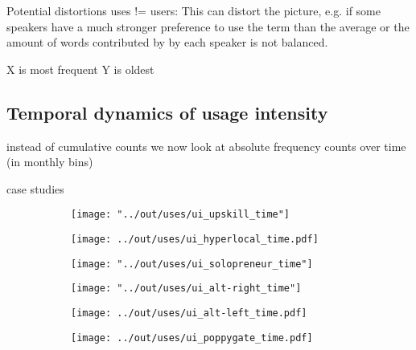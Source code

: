 \documentclass[draft, a4paper, abstract=on]{scrartcl}
\begin{document}
Potential distortions
uses != users: This can distort the picture, e.g. if some speakers have a much stronger preference to use the term than the average or the amount of words contributed by by each speaker is not balanced.


X is most frequent
Y is oldest

  \subsection{Temporal dynamics of usage intensity}

instead of cumulative counts we now look at absolute frequency counts over time (in monthly bins)

case studies

\begin{figure}
\caption{Temporal dynamics in usage frequency for case studies.}
\centering
\begin{subfigure}{.3\linewidth}
\caption{}
\texttt{[image: "../out/uses/ui\_upskill\_time"]}
\end{subfigure}
\begin{subfigure}{.3\linewidth}
\caption{}
\texttt{[image: ../out/uses/ui\_hyperlocal\_time.pdf]}
\end{subfigure}
\begin{subfigure}{.3\linewidth}
\caption{}
\texttt{[image: "../out/uses/ui\_solopreneur\_time"]}
\end{subfigure}

\begin{subfigure}{.3\linewidth}
\caption{}
\texttt{[image: "../out/uses/ui\_alt-right\_time"]}
\end{subfigure}
\begin{subfigure}{.3\linewidth}
\caption{}
\texttt{[image: ../out/uses/ui\_alt-left\_time.pdf]}
\end{subfigure}
\begin{subfigure}{.3\linewidth}
\caption{}
\texttt{[image: ../out/uses/ui\_poppygate\_time.pdf]}
\end{subfigure}
\end{figure}
\end{document}
